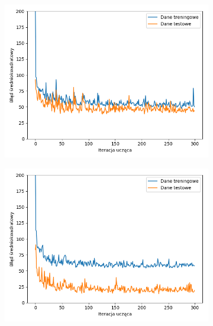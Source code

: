 \documentclass[12pt]{aghdpl}
\begin{document}
		\begin{figure}[h]
			\begin{subfigure}{.5\linewidth}
		 		\includegraphics[width =\linewidth]{wykresy/3_drugi_model_tworzenie_i_analiza/wykres_uczenia.png}
		 	\end{subfigure}
		 	\begin{subfigure}{.5\linewidth}
		 		\includegraphics[width =\linewidth]{wykresy/4_zwiekszenie_stopnia_skomplikowania_modelu/1_warstwa_40_neuronow_wykres_uczenia.png}
		 	\end{subfigure}
		 	

\end{figure}
\end{document}

